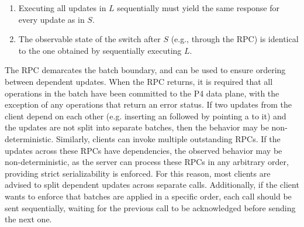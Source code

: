 \documentclass[11pt]{article}
\begin{document}
{\begin{enumerate}[noitemsep,topsep=\mdcompacttopsep]
\item{}Executing all updates in $L$ sequentially must yield the same response for
every update as in $S$.%

\item{}The observable state of the switch after $S$ (e.g., through the  RPC)
is identical to the one obtained by sequentially executing $L$.%
\end{enumerate}%

\noindent{}The  RPC demarcates the batch boundary, and can be used to ensure
ordering between dependent updates. When the  RPC returns, it is required
that all operations in the batch have been committed to the P4 data plane, with
the exception of any operations that return an error status.  If two updates
from the client depend on each other (e.g. inserting an 
followed by pointing a  to it) and the updates are not split into
separate batches, then the behavior may be non-deterministic.  Similarly,
clients can invoke multiple outstanding  RPCs. If the updates across
these RPCs have dependencies, the observed behavior may be non-deterministic, as
the server can process these RPCs in any arbitrary order, providing strict
serializability is enforced. For this reason, most clients are advised to split
dependent updates across separate  calls. Additionally, if the client
wants to enforce that batches are applied in a specific order, each  call
should be sent sequentially, waiting for the previous call to be acknowledged
before sending the next one.%

}
\end{document}
